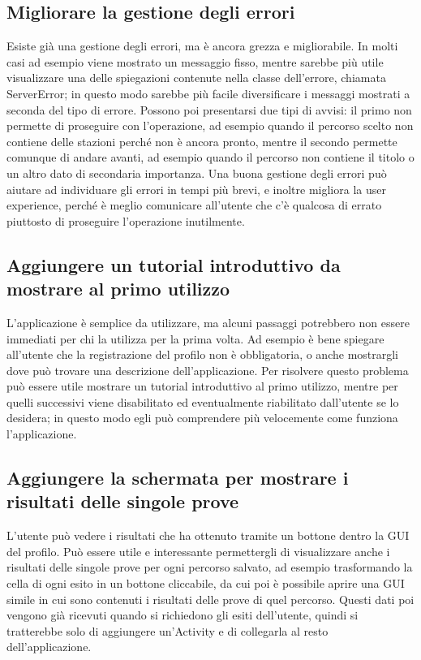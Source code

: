 	\subsection{Migliorare la gestione degli errori}
		Esiste già una gestione degli errori, ma è ancora grezza e migliorabile. In molti casi ad esempio viene mostrato un messaggio fisso, mentre sarebbe più utile visualizzare una delle spiegazioni contenute nella classe dell'errore, chiamata ServerError; in questo modo sarebbe più facile diversificare i messaggi mostrati a seconda del tipo di errore. Possono poi presentarsi due tipi di avvisi: il primo non permette di proseguire con l'operazione, ad esempio quando il percorso scelto non contiene delle stazioni perché non è ancora pronto, mentre il secondo permette comunque di andare avanti, ad esempio quando il percorso non contiene il titolo o un altro dato di secondaria importanza. Una buona gestione degli errori può aiutare ad individuare gli errori in tempi più brevi, e inoltre migliora la user experience, perché è meglio comunicare all'utente che c'è qualcosa di errato piuttosto di proseguire l'operazione inutilmente.
	\label{tutorial}
	\subsection{Aggiungere un tutorial introduttivo da mostrare al primo utilizzo}
		L'applicazione è semplice da utilizzare, ma alcuni passaggi potrebbero non essere immediati per chi la utilizza per la prima volta. Ad esempio è bene spiegare all'utente che la registrazione del profilo non è obbligatoria, o anche mostrargli dove può trovare una descrizione dell'applicazione. Per risolvere questo problema può essere utile mostrare un tutorial introduttivo al primo utilizzo, mentre per quelli successivi viene disabilitato ed eventualmente riabilitato dall'utente se lo desidera; in questo modo egli può comprendere più velocemente come funziona l'applicazione.
	\subsection{Aggiungere la schermata per mostrare i risultati delle singole prove}
		L'utente può vedere i risultati che ha ottenuto tramite un bottone dentro la GUI del profilo. Può essere utile e interessante permettergli di visualizzare anche i risultati delle singole prove per ogni percorso salvato, ad esempio trasformando la cella di ogni esito in un bottone cliccabile, da cui poi è possibile aprire una GUI simile in cui sono contenuti i risultati delle prove di quel percorso. Questi dati poi vengono già ricevuti quando si richiedono gli esiti dell'utente, quindi si tratterebbe solo di aggiungere un'Activity e di collegarla al resto dell'applicazione.

